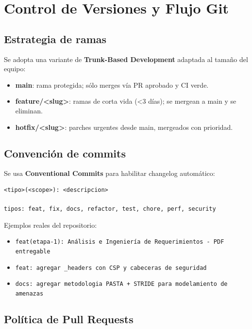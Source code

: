 \documentclass[12pt,a4paper,oneside]{article}
\begin{document}
\section{Control de Versiones y Flujo Git}

\subsection{Estrategia de ramas}

Se adopta una variante de \textbf{Trunk-Based Development} adaptada al tamaño del equipo:

\begin{itemize}[leftmargin=*]
  \item \textbf{main}: rama protegida; sólo merges vía PR aprobado y CI verde.
  \item \textbf{feature/<slug>}: ramas de corta vida (<3 días); se mergean a main y se eliminan.
  \item \textbf{hotfix/<slug>}: parches urgentes desde main, mergeados con prioridad.
\end{itemize}

\subsection{Convención de commits}

Se usa \textbf{Conventional Commits} para habilitar changelog automático:

\begin{lstlisting}
<tipo>(<scope>): <descripcion>

tipos: feat, fix, docs, refactor, test, chore, perf, security
\end{lstlisting}

Ejemplos reales del repositorio:
\begin{itemize}
  \item \texttt{feat(etapa-1): Análisis e Ingeniería de Requerimientos - PDF entregable}
  \item \texttt{feat: agregar \_headers con CSP y cabeceras de seguridad}
  \item \texttt{docs: agregar metodologia PASTA + STRIDE para modelamiento de amenazas}
\end{itemize}

\subsection{Política de Pull Requests}
\end{document}
